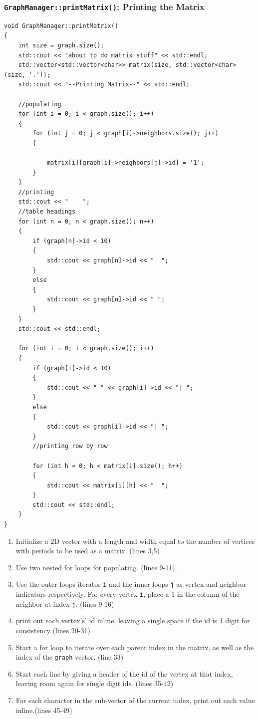 \documentclass[letterpaper, 10pt]{article}
\begin{document}
\newpage

\subsubsection{\texttt{GraphManager::printMatrix()}: Printing the Matrix}

\begin{addmargin}[-5em]{1em}
\begin{small}
\begin{verbatim}
void GraphManager::printMatrix()
{
	int size = graph.size();
	std::cout << "about to do matrix stuff" << std::endl;
	std::vector<std::vector<char>> matrix(size, std::vector<char>(size, '.'));
	std::cout << "--Printing Matrix--" << std::endl;

	//populating
	for (int i = 0; i < graph.size(); i++)
	{
		for (int j = 0; j < graph[i]->neighbors.size(); j++)
		{

			matrix[i][graph[i]->neighbors[j]->id] = '1';
		}
	}
	//printing
	std::cout << "    ";
	//table headings
	for (int n = 0; n < graph.size(); n++)
	{
		if (graph[n]->id < 10)
		{
			std::cout << graph[n]->id << "  ";
		}
		else
		{
			std::cout << graph[n]->id << " ";
		}
	}
	std::cout << std::endl;

	for (int i = 0; i < graph.size(); i++)
	{
		if (graph[i]->id < 10)
		{
			std::cout << " " << graph[i]->id << "| ";
		}
		else
		{
			std::cout << graph[i]->id << "| ";
		}
		//printing row by row

		for (int h = 0; h < matrix[i].size(); h++)
		{
			std::cout << matrix[i][h] << "  ";
		}
		std::cout << std::endl;
	}
}
\end{verbatim}
\end{small}
\end{addmargin}

\begin{enumerate}
    \item Initialize a 2D vector with a length and width equal to the number of vertices with periods to be used as a matrix. (lines 3,5)
    \item Use two nested for loops for populating. (lines 9-11).
    \item Use the outer loops iterator \texttt{i} and the inner loops \texttt{j} as vertex and neighbor indicators respectively. For every vertex \texttt{i}, place a 1 in the column of the neighbor at index \texttt{j}. (lines 9-16)
    \item print out each vertex's' id inline, leaving a single space if the id is 1 digit for consistency (lines 20-31)
    \item Start a for loop to iterate over each parent index in the matrix, as well as the index of the \texttt{graph} vector. (line 33)
    \item Start each line by giving a header of the id of the vertex at that index, leaving room again for single digit ids. (lines 35-42)
    \item For each character in the sub-vector of the current index, print out each value inline.(lines 45-49)
    
\end{enumerate}
\end{document}
